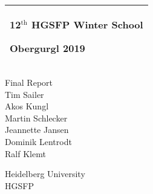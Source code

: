 %
%
%
%
%
\begin{titlepage}
  \addtolength{\hoffset}{0.5\evensidemargin-0.5\oddsidemargin} %
  \noindent%
  \begin{tabular}{@{}p{\textwidth}@{}}
    \toprule[2pt]
    \midrule
    \vspace{0.2cm}
    \begin{center}
    \Huge{\textbf{
      12$^\text{th}$ HGSFP Winter School%
    }}
    \end{center}
    \begin{center}
      \Large{
        Obergurgl 2019%
      }
    \end{center}
    \vspace{0.2cm}\\
    \midrule
    \toprule[2pt]
  \end{tabular}
  \vspace{4 cm}
  \begin{center}
    {\large
      Final Report%
    }\\
    \vspace{0.2cm}
    {\Large
	Tim Sailer\\
	Akos Kungl\\
	Martin Schlecker\\
	Jeannette Jansen\\
	Dominik Lentrodt\\
	Ralf Klemt\\

    }
  \end{center}
  \vfill
  \begin{center}
  Heidelberg University\\
  HGSFP
  \end{center}
\end{titlepage}